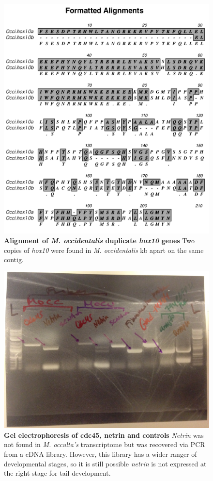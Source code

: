 \begin{figure}[tbp]
\centering
\includegraphics[scale=0.95]{figures/Occi_hox10.pdf}
\caption{\textbf{Alignment of \textit{M. occidentalis} duplicate \textit{hox10} genes} Two copies of \textit{hox10} were found in \textit{M. occidentalis}  kb apart on the same contig.}
\label{fig:occihox10}
\end{figure}

\begin{figure}[tbp]
\centering
\includegraphics[scale=0.10]{figures/gel.jpg}
\caption{\textbf{Gel electrophoresis of cdc45, netrin and controls} \textit{Netrin} was not found in \textit{M. occulta's} transcriptome but was recovered via PCR from a cDNA library. However, this library has a wider ranger of developmental stages, so it is still possible \textit{netrin} is not expressed at the right stage for tail development.}
\label{fig:gel}
\end{figure}

